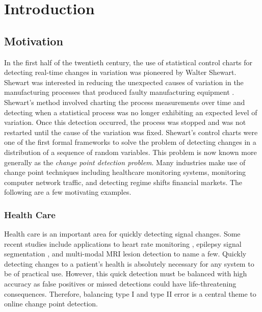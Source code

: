 \chapter{Introduction}
\section{Motivation}
In the first half of the twentieth century, the use of statistical control charts for detecting real-time changes in variation was pioneered by Walter Shewart.  Shewart was interested in reducing the unexpected causes of variation in the manufacturing processes that produced faulty manufacturing equipment \cite{shewhart1931economic}. Shewart's method involved charting the process measurements over time and detecting when a statistical process was no longer exhibiting an expected level of variation. Once this detection occurred, the process was stopped and was not restarted until the cause of the variation was fixed.
Shewart's control charts were one of the first formal frameworks to solve the problem of detecting changes in a distribution of a sequence of random variables. This problem is now known more generally as the \textit{change point detection problem}. Many industries make use of change point techniques including healthcare monitoring systems, monitoring computer network traffic, and detecting regime shifts financial markets. The following are a few motivating examples.

\subsection{Health Care}
Health care is an important area for quickly detecting signal changes. Some recent studies include applications to heart rate monitoring \cite{yang2006adaptive} \cite{staudacher2005new}, epilepsy signal segmentation \cite{malladi2013online}, and multi-modal MRI lesion detection \cite{bosc2003automatic} to name a few. Quickly detecting changes to a patient's health is absolutely necessary for any system to be of practical use. However, this quick detection must be balanced with high accuracy as false positives or missed detections could have life-threatening consequences. Therefore, balancing type I and type II error is a central theme to online change point detection.


